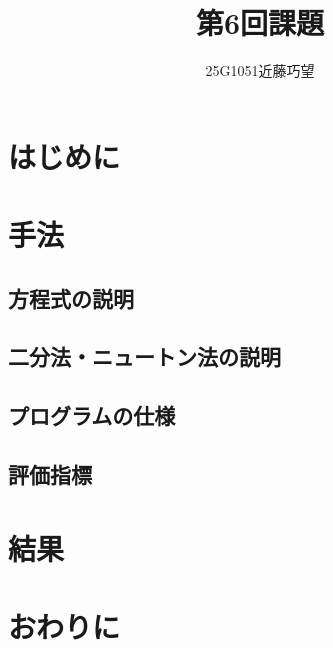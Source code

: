 \documentclass[uplatex]{jsarticle}
\begin{document}
\title{第6回課題}
\author{25G1051近藤巧望}
\maketitle

\section{はじめに}
\section{手法}
\subsection{方程式の説明}
\subsection{二分法・ニュートン法の説明}
\subsection{プログラムの仕様}
\subsection{評価指標}
\section{結果}
\section{おわりに}
\end{document}
